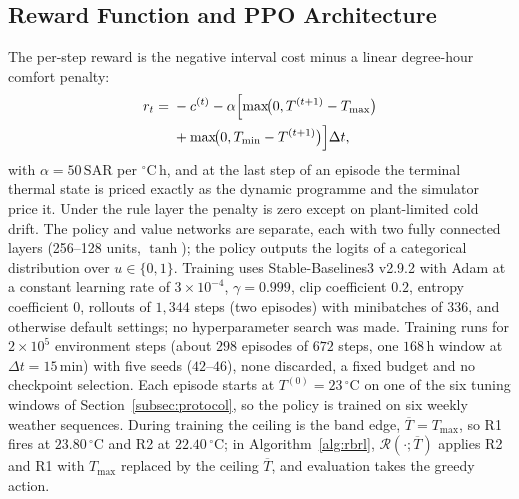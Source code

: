 \documentclass[pdflatex,sn-mathphys-num,iicol]{sn-jnl}
\theoremstyle{thmstyleone}\newtheorem{proposition}{Proposition}\newtheorem{corollary}{Corollary}
\theoremstyle{thmstyletwo}\newtheorem{remark}{Remark}\newtheorem{observation}{Observation}
\theoremstyle{thmstylethree}\newtheorem{definition}{Definition}
\newcommand{\Tmin}{T_{\min}}
\newcommand{\Tmax}{T_{\max}}
\newcommand{\SAR}{\text{SAR}}
\begin{document}
\subsection{Reward Function and PPO Architecture}
\label{subsec:reward}
 
The per-step reward is the negative interval cost minus a linear degree-hour comfort penalty:
\begin{equation}
\begin{split}
  r_t={}&-c^{(t)}-\alpha\Bigl[\max\!\bigl(0,T^{(t+1)}-\Tmax\bigr)\\
       &+\max\!\bigl(0,\Tmin-T^{(t+1)}\bigr)\Bigr]\Delta t,
\end{split}
  \label{eq:reward}
\end{equation}
with $\alpha=50\,\SAR$ per $^\circ$C\,h, and at the last step of an episode the terminal thermal state is priced exactly as the dynamic programme and the simulator price it. Under the rule layer the penalty is zero except on plant-limited cold drift. The policy and value networks are separate, each with two fully connected layers (256--128 units, $\tanh$); the policy outputs the logits of a categorical distribution over $u\in\{0,1\}$. Training uses Stable-Baselines3 v2.9.2 \citep{Raffin2021} with Adam at a constant learning rate of $3\times10^{-4}$, $\gamma=0.999$, clip coefficient $0.2$, entropy coefficient $0$, rollouts of $1{,}344$ steps (two episodes) with minibatches of $336$, and otherwise default settings; no hyperparameter search was made. Training runs for $2\times10^{5}$ environment steps (about $298$ episodes of $672$ steps, one $168\,$h window at $\Delta t=15\,$min) with five seeds ($42$--$46$), none discarded, a fixed budget and no checkpoint selection. Each episode starts at $T^{(0)}=23\,^\circ$C on one of the six tuning windows of Section~\ref{subsec:protocol}, so the policy is trained on six weekly weather sequences. During training the ceiling is the band edge, $\overline{T}=\Tmax$, so R1 fires at $23.80\,^\circ$C and R2 at $22.40\,^\circ$C; in Algorithm~\ref{alg:rbrl}, $\mathcal{R}(\cdot;\overline{T})$ applies R2 and R1 with $\Tmax$ replaced by the ceiling $\overline{T}$, and evaluation takes the greedy action.
\end{document}
